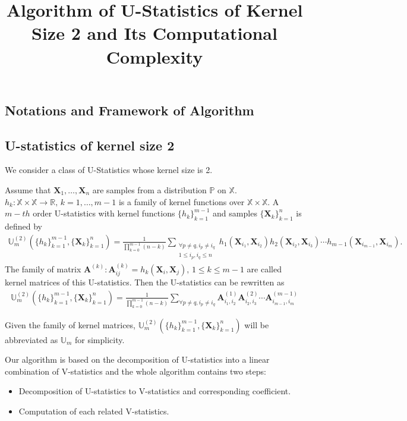 \documentclass{biometrika}
\renewcommand{\_}{\raisebox{.5pt}{\underline{\phantom{x}}}}
\def\bbU{\mathbb{U}}
\def\bbP{\mathbb{P}}
\def\bbR{\mathbb{R}}
\def\bA{\mathbf{A}}
\def\bX{\mathbf{X}}
\def\bbX{\mathbb{X}}
\def\mytitle{Algorithm of U-Statistics 
 of Kernel Size 2 and Its Computational Complexity}
\begin{document}
\title{\mytitle}
\maketitle

\begin{bibunit}[biometrika]

\section{Notations and Framework of Algorithm}
\subsection{U-statistics of kernel size 2}
We consider a class of U-Statistics whose kernel size is 2.
\begin{definition}
    Assume that $\bX_1, \ldots, \bX_n$ are samples from a
    distribution $\bbP$ on $\bbX$. $h_k: \bbX \times \bbX \to \bbR, \, k = 1,\ldots, m-1$
    is a family of kernel functions over $\bbX \times \bbX$.
    A $m-th$ order U-statistics with kernel functions $\{h_k\}_{k=1}^{m-1}$ and samples $\{\bX_k\}_{k=1}^n$ is defined by
    \begin{align*}
        \bbU_m^{(2)}(\{h_k\}_{k=1}^{m-1},\{\bX_k\}_{k=1}^n) = \frac{1}{\prod_{k=0}^{m-1} (n-k)} \sum_{\substack{\forall p \neq q, i_p \neq i_q \\ 1 \leq i_p, i_q \leq n}} h_1(\bX_{i_1}, \bX_{i_2}) h_2(\bX_{i_2}, \bX_{i_3}) \cdots h_{m-1}(\bX_{i_{m-1}}, \bX_{i_m}).
    \end{align*}
    The family of matrix $\bA^{(k)}: \bA^{(k)}_{ij} = h_k(\bX_i, \bX_j) , \, 1 \leq k \leq m-1$ are called kernel matrices of this U-statistics.
    Then the U-statistics can be rewritten as
    \begin{align*}
        \bbU_m^{(2)}(\{h_k\}_{k=1}^{m-1},\{\bX_k\}_{k=1}^n) = \frac{1}{\prod_{k=0}^{m-1} (n-k)} \sum_{\forall p \neq q, i_p \neq i_q} \bA^{(1)}_{i_1,i_2} \bA^{(2)}_{i_2,i_3} \cdots \bA^{(m-1)}_{i_{m-1}, i_m}
    \end{align*}
\end{definition}

Given the family of kernel matrices, $\bbU_m^{(2)}(\{h_k\}_{k=1}^{m-1},\{\bX_k\}_{k=1}^n)$ will be abbreviated as $\bbU_m$ for simplicity.

Our algorithm is based on the decomposition of U-statistics into a linear combination of V-statistics and the whole algorithm contains two steps:
\begin{itemize}
    \item[1.] Decomposition of U-statistics to V-statistics and corresponding coefficient.
    \item[2.] Computation of each related V-statistics.
\end{itemize}


\end{bibunit}
\end{document}

